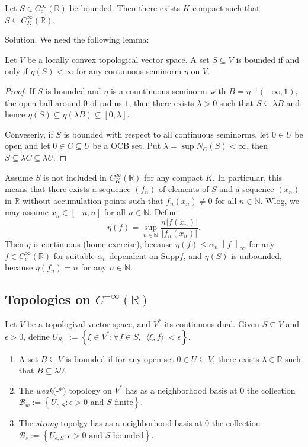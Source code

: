 \documentclass[12pt, reqno,a4paper, twoside]{amsproc}
\newcommand{\supp}{\mathrm{Supp}}
\newcommand{\dbN}{\mathbb N}
\newcommand{\dbR}{\mathbb R}
\newcommand{\gen}[1]{\langle{#1}\rangle}
\newcommand{\set}[1]{\left\{{#1}\right\}}
\newcommand{\norm}[1]{\left\|#1\right\|}
\newcommand{\abs}[1]{\left|#1\right|}
\newcommand{\mcal}{\mathcal}
\newenvironment{sol}{\sc Solution. \rm}{\hfill \qedsymbol\bigskip}
\begin{document}
	\begin{exer}
		Let $S\in C_c^\infty(\dbR)$ be bounded. Then there exists $K$ compact such that $S\subseteq C^\infty_K(\dbR)$. 
	\end{exer}

\begin{sol}
	We need the following lemma:
	\begin{lem}
		Let $V$ be a locally convex topological vector space. A set $S\subseteq V$ is bounded if and only if $\eta(S)<\infty$ for any continuous seminorm $\eta$ on $V$.
	\end{lem}
	\begin{proof}
		If $S$ is bounded and $\eta$ is a countinuous seminorm with $B=\eta^{-1}(-\infty,1)$, the open ball around $0$ of radius $1$, then there exists $\lambda>0$ such that $S\subseteq \lambda B$ and hence $\eta(S)\subseteq \eta(\lambda B)\subseteq [0,\lambda]$. 
		
		Conveserly, if $S$ is bounded with respect to all continuous seminorms, let $0\in U$ be open and let $0\in C\subseteq U$ be a OCB set. Put $\lambda=\sup N_C(S)<\infty$, then $S\subseteq \lambda C\subseteq \lambda U$. 
	\end{proof}
	Assume $S$ is not included in $C_K^\infty(\dbR)$ for any compact $K$. In particular, this means that there exists a sequence $(f_n)$ of elements of $S$ and a sequence $(x_n)$ in $\dbR$ without accumulation points such that $f_n(x_n)\ne 0$ for all $n\in\dbN$. Wlog, we may assume $x_n\in [-n,n]$ for all $n\in\dbN$. Define
	\[\eta(f)=\sup_{n\in\dbN}\frac{n\abs{f(x_n)}}{\abs{f_n(x_n)}}.\]
	Then $\eta$ is continuous (home exercise), because $\eta(f)\le \alpha_n \norm{f}_\infty$ for any $f\in C_c^\infty(\dbR)$ for suitable $\alpha_n$ dependent on $\supp{f}$, and $\eta(S)$ is unbounded, because $\eta(f_n)=n$ for any $n\in\dbN$.
\end{sol}

\subsection{Topologies on $C^{-\infty}(\dbR)$}
\begin{defi}
	Let $V$ be a topologival vector space, and $V^*$ its continuous dual. Given $S\subseteq V$ and $\epsilon>0$, define $U_{S,\epsilon}:=\set{\xi\in V^*: \forall f\in S,\:\abs{\gen{\xi,f}}<\epsilon}$.
	\begin{enumerate}
		\item A set $B\subseteq V$ is bounded if for any open set $0\in U\subseteq V$, there exists $\lambda\in\dbR$ such that $B\subseteq\lambda U$.
		\item The \emph{weak}(-$*$) topology on $V^*$ has as a neighborhood basis at $0$ the collection $\mcal{B}_w:=\set{U_{\epsilon,S}: \epsilon>0\text{ and }S\text{ finite}}$.
		\item  The \emph{strong} topolgy has as a neighborhood basis at $0$ the collection $\mcal{B}_s:=\set{U_{\epsilon,S}:\epsilon>0\text{ and } S\text{ bounded}}$.
	\end{enumerate}
\end{defi}
\end{document}
